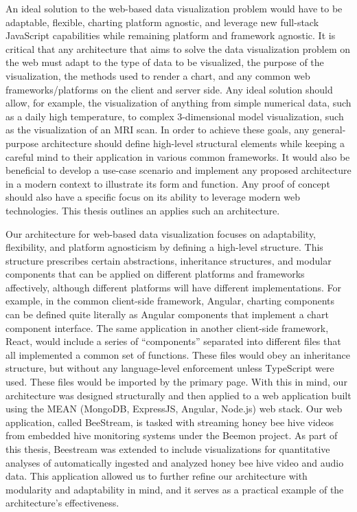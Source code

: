 An ideal solution to the web-based data visualization problem would have to be adaptable, flexible, charting platform agnostic, and leverage new full-stack JavaScript capabilities while remaining platform and framework agnostic.  It is critical that any architecture that aims to solve the data visualization problem on the web must adapt to the type of data to be visualized, the purpose of the visualization, the methods used to render a chart, and any common web frameworks/platforms on the client and server side.  Any ideal solution should allow, for example, the visualization of anything from simple numerical data, such as a daily high temperature, to complex 3-dimensional model visualization, such as the visualization of an MRI scan.  In order to achieve these goals, any general-purpose architecture should define high-level structural elements while keeping a careful mind to their application in various common frameworks.  It would also be beneficial to develop a use-case scenario and implement any proposed architecture in a modern context to illustrate its form and function.  Any proof of concept should also have a specific focus on its ability to leverage modern web technologies.  This thesis outlines an applies such an architecture. \par
Our architecture for web-based data visualization focuses on adaptability, flexibility, and platform agnosticism by defining a high-level structure.  This structure prescribes certain abstractions, inheritance structures, and modular components that can be applied on different platforms and frameworks affectively, although different platforms will have different implementations.  For example, in the common client-side framework, Angular, charting components can be defined quite literally as Angular components that implement a chart component interface.  The same application in another client-side framework, React, would include a series of “components” separated into different files that all implemented a common set of functions.  These files would obey an inheritance structure, but without any language-level enforcement unless TypeScript were used.  These files would be imported by the primary page.  With this in mind, our architecture was designed structurally and then applied to a web application built using the MEAN (MongoDB, ExpressJS, Angular, Node.js) web stack.  Our web application, called BeeStream, is tasked with streaming honey bee hive videos from embedded hive monitoring systems under the Beemon project.  As part of this thesis, Beestream was extended to include visualizations for quantitative analyses of automatically ingested and analyzed honey bee hive video and audio data.  This application allowed us to further refine our architecture with modularity and adaptability in mind, and it serves as a practical example of the architecture’s effectiveness. \par
